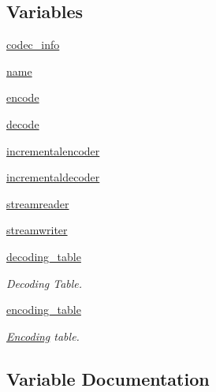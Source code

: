 \subsection*{Variables}
\begin{DoxyCompactItemize}
\item 
\hyperlink{namespacepip_1_1__vendor_1_1webencodings_1_1x__user__defined_a8191fc55cbd4d2c38062f77532c3f0fc}{codec\+\_\+info}
\item 
\hyperlink{namespacepip_1_1__vendor_1_1webencodings_1_1x__user__defined_a8ff8fb816a7996c7bf983c0a5785e9dd}{name}
\item 
\hyperlink{namespacepip_1_1__vendor_1_1webencodings_1_1x__user__defined_a50c5b4980e11d58bed02a7b0ce758a90}{encode}
\item 
\hyperlink{namespacepip_1_1__vendor_1_1webencodings_1_1x__user__defined_a56e8e303e24e9b240566f46d1eb7bb02}{decode}
\item 
\hyperlink{namespacepip_1_1__vendor_1_1webencodings_1_1x__user__defined_a2d9ea830a14d04f39802c0b0a440f26d}{incrementalencoder}
\item 
\hyperlink{namespacepip_1_1__vendor_1_1webencodings_1_1x__user__defined_ab50f760eec8bf57c7208b8095898effd}{incrementaldecoder}
\item 
\hyperlink{namespacepip_1_1__vendor_1_1webencodings_1_1x__user__defined_ae3fde4fb2b2f7189b7ab5be0e3c63360}{streamreader}
\item 
\hyperlink{namespacepip_1_1__vendor_1_1webencodings_1_1x__user__defined_af0bcce37426a3c24f10a8d61dfce7314}{streamwriter}
\item 
\hyperlink{namespacepip_1_1__vendor_1_1webencodings_1_1x__user__defined_a1c431122aed26cb6287176a6720304b6}{decoding\+\_\+table}
\begin{DoxyCompactList}\small\item\em Decoding Table. \end{DoxyCompactList}\item 
\hyperlink{namespacepip_1_1__vendor_1_1webencodings_1_1x__user__defined_ad22e14cc9cab1592538f3a6a36d7475d}{encoding\+\_\+table}
\begin{DoxyCompactList}\small\item\em \hyperlink{classpip_1_1__vendor_1_1webencodings_1_1Encoding}{Encoding} table. \end{DoxyCompactList}\end{DoxyCompactItemize}


\subsection{Variable Documentation}
\mbox{\label{namespacepip_1_1__vendor_1_1webencodings_1_1x__user__defined_a8191fc55cbd4d2c38062f77532c3f0fc}} 
